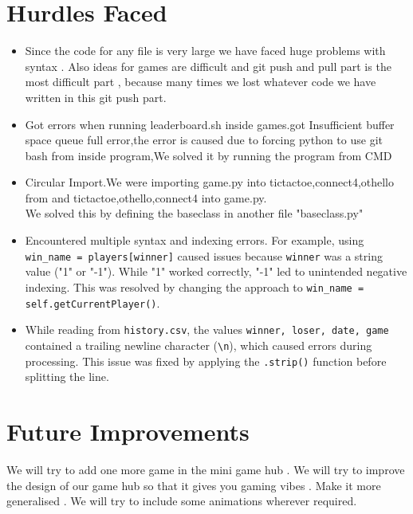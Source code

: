 \documentclass{article}
\begin{document}
\section{Hurdles Faced}
\begin{itemize}
\item{Since the code for any file is very large we have faced huge problems with syntax . Also ideas for games are difficult and git push and pull part is the most difficult part , because many times we lost whatever code we have written in this git push part.}
\item{Got errors when running leaderboard.sh inside games.got Insufficient buffer space queue full error,the error is caused due to forcing python to use git bash from inside program,We solved it by running the program from CMD}
\item{Circular Import.We were importing game.py into tictactoe,connect4,othello from and tictactoe,othello,connect4 into game.py.\\We solved this by defining the baseclass in another file "baseclass.py" }
\item Encountered multiple syntax and indexing errors. For example, using \texttt{win\_name = players[winner]} caused issues because \texttt{winner} was a string value ("1" or "-1"). While "1" worked correctly, "-1" led to unintended negative indexing. This was resolved by changing the approach to \texttt{win\_name = self.getCurrentPlayer()}.

\item While reading from \texttt{history.csv}, the values \texttt{winner, loser, date, game} contained a trailing newline character (\texttt{\textbackslash n}), which caused errors during processing. This issue was fixed by applying the \texttt{.strip()} function before splitting the line.
\end{itemize}
\section{Future Improvements}
We will try to add one more game in the mini game hub . We will try to improve the design of our game hub so that it gives you gaming vibes . Make it more generalised . We will try to include some animations wherever required.


\end{document}
